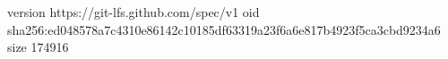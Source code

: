 version https://git-lfs.github.com/spec/v1
oid sha256:ed048578a7c4310e86142c10185df63319a23f6a6e817b4923f5ca3cbd9234a6
size 174916
